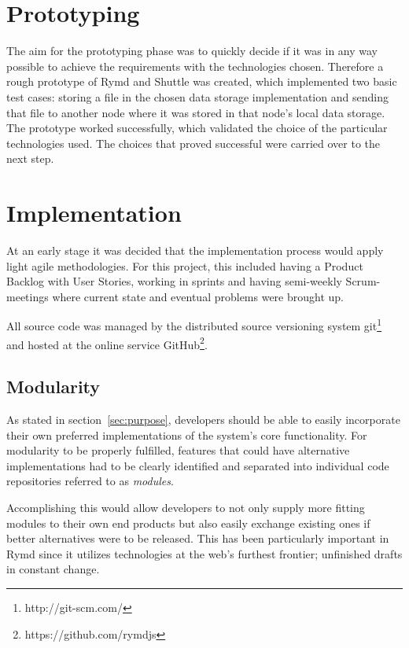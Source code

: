 \section{Prototyping}

The aim for the prototyping phase was to quickly decide if it was in any way possible to achieve the requirements with the technologies chosen. Therefore a rough prototype of Rymd and Shuttle was created, which implemented two basic test cases: storing a file in the chosen data storage implementation and sending that file to another node where it was stored in that node's local data storage. The prototype worked successfully, which validated the choice of  the particular technologies used. The choices that proved successful were carried over to the next step.

\section{Implementation}

At an early stage it was decided that the implementation process would apply light agile methodologies. For this project, this included having a Product Backlog with User Stories, working in sprints and having semi-weekly Scrum-meetings where current state and eventual problems were brought up.

All source code was managed by the distributed source versioning system git\footnote{http://git-scm.com/} and hosted at the online service GitHub\footnote{https://github.com/rymdjs}.

\subsection{Modularity}
\label{sec:modularity}

As stated in section~\ref{sec:purpose}, developers should be able to easily incorporate their own preferred implementations of the system's core functionality. For modularity to be properly fulfilled, features that could have alternative implementations had to be clearly identified and separated into individual code repositories referred to as \emph{modules}.

Accomplishing this would allow developers to not only supply more fitting modules to their own end products but also easily exchange existing ones if better alternatives were to be released. This has been particularly important in Rymd since it utilizes technologies at the web's furthest frontier; unfinished drafts in constant change.
